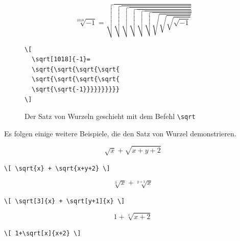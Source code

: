 \documentclass[a4paper,10pt,twoside]{scrbook}
\begin{document}
\begin{figure}[H]
\begin{minipage}[c]{.5\textwidth}
\setlength{\parskip}{1em}

\[
  \sqrt[1018]{-1}=
  \sqrt{\sqrt{\sqrt{\sqrt{
  \sqrt{\sqrt{\sqrt{\sqrt{
  \sqrt{\sqrt{-1}}}}}}}}}}
\]

\end{minipage}
\hfill
\begin{minipage}{.48\textwidth}
\setlength{\parskip}{1em}
\begin{lstlisting}[label=sqrtbeispiel, style=customlatex]
\[
  \sqrt[1018]{-1}=
  \sqrt{\sqrt{\sqrt{\sqrt{
  \sqrt{\sqrt{\sqrt{\sqrt{
  \sqrt{\sqrt{-1}}}}}}}}}}
\]
\end{lstlisting}
\end{minipage}
\caption{Der Satz von Wurzeln geschieht mit dem Befehl \texttt{\textbackslash sqrt}}
\label{Beispiel_sqrt1}
\end{figure}

Es folgen einige weitere Beispiele, die den Satz von Wurzel demonstrieren.

\begin{minipage}[c]{.4\textwidth}
\vspace*{-5mm}
\[ \sqrt{x} + \sqrt{x+y+2} \] 
\end{minipage}
\hfill
\begin{minipage}[c]{.58\textwidth}
\setlength{\parskip}{1em}
\verb!\[ \sqrt{x} + \sqrt{x+y+2} \] !
\end{minipage}

\begin{minipage}[c]{.4\textwidth}
\vspace*{-5mm}
\[ \sqrt[3]{x} + \sqrt[y+1]{x} \]
\end{minipage}
\hfill
\begin{minipage}[c]{.58\textwidth}
\setlength{\parskip}{1em}
\verb!\[ \sqrt[3]{x} + \sqrt[y+1]{x} \] !
\end{minipage}

\begin{minipage}[c]{.4\textwidth}
\vspace*{-5mm}
\[ 1+\sqrt[x]{x+2} \]
\end{minipage}
\hfill
\begin{minipage}[c]{.58\textwidth}
\setlength{\parskip}{1em}
\verb!\[ 1+\sqrt[x]{x+2} \] !
\end{minipage}
\end{document}
